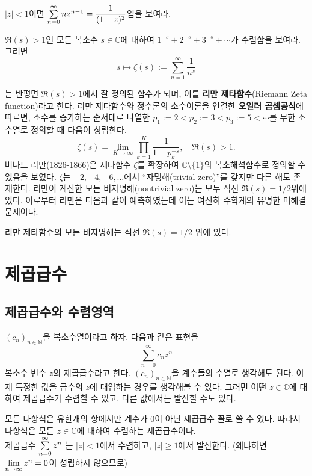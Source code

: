 \begin{salt_exercise}\label{ex-4-4}
$|z|<1$이면 $\sum\limits_{n=0}^\infty nz^{n-1} = \displaystyle\frac1{(1-z)^2}$임을 보여라.
\end{salt_exercise}

\begin{salt_exercise}\label{ex-4-5}
$\Re(s)>1$인 모든 복소수 $s\in \mathbb C$에 대하여
$1^{-s} +  2^{-s} + 3^{-s} + \cdots$가 수렴함을 보여라.
그러면
\[
s \mapsto \zeta(s) := \sum_{n=1}^\infty \dfrac1{n^s}
\]
\end{salt_exercise}
는 반평면 $\Re(s)>1$에서 잘 정의된 함수가 되며, 이를 
{\bf 리만 제타함수}(Riemann Zeta function)라고 한다.
리만 제타함수와 정수론의 소수이론을 연결한 {\bf 오일러 곱셈공식}에 따르면,
소수를 증가하는 순서대로 나열한
$p_1:=2 < p_2:=3 < p_3:=5 < \cdots$를 무한 소수열로 정의할 때 다음이 성립한다.
\[
\zeta(s) = \lim_{K\to \infty} \prod_{k=1}^K \dfrac1{1-p_k^{-s}},
\quad \Re(s)>1.
\]
버나드 리만(1826-1866)은 제타함수 $\zeta$를 확장하여 $\mathbb C\setminus \{1\}$의 
복소해석함수로 정의할 수 있음을 보였다. 
$\zeta$는 $-2, -4, -6, \ldots$에서 ``자명해(trivial zero)''를 갖지만
다른 해도 존재한다. 리만이 계산한 모든 비자명해(nontrivial zero)는 모두 직선 $\Re(s) = 1/2$위에
있다. 이로부터 리만은 다음과 같이 예측하였는데 이는 여전히 수학계의 유명한 미해결 문제이다.

\begin{salt_conjecture} \label{conj-4-1}
리만 제타함수의 모든 비자명해는 직선 $\Re(s) = 1/2$ 위에 있다.
\end{salt_conjecture}

\section{제곱급수}

\subsection{제곱급수와 수렴영역}

$(c_n)_{n\in\mathbb N}$을 복소수열이라고 하자.
다음과 같은 표현을
\[
\sum_{n=0}^\infty c_nz^n
\]
복소수 변수 $z$의 제곱급수라고 한다. $(c_n)_{n\in\mathbb N}$을 계수들의 수열로 생각해도 된다.
이제 특정한 값을 급수의  $z$에 대입하는 경우를 생각해볼 수 있다.
그러면 어떤 $z\in\mathbb C$에 대하여 제곱급수가 수렴할 수 있고, 
다른 값에서는 발산할 수도 있다.

\begin{saltexample}[label=example-4-1]{}{}
모든 다항식은 유한개의 항에서만 계수가 $0$이 아닌 제곱급수 꼴로 쓸 수 있다.
따라서 다항식은 모든 $z\in\mathbb C$에 대하여 수렴하는 제곱급수이다. \\[1ex]

제곱급수  
$
\sum\limits_{n=0}^\infty z^n
$
는 $|z|<1$에서 수렴하고,
$|z|\ge1$에서 발산한다. (왜냐하면 $\lim\limits_{n\to\infty} z^n = 0$이 성립하지 않으므로)
\end{saltexample}

